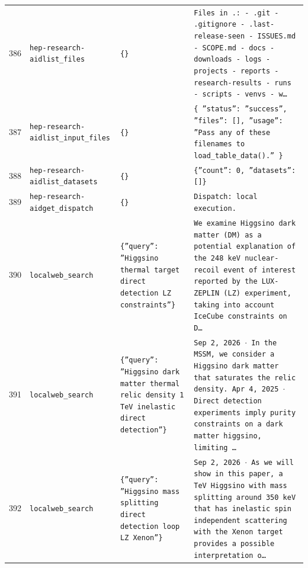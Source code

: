 \documentclass[11pt,a4paper]{article}
\begin{document}
\begin{longtable}{@{}p{}p{}p{}p{}@{}}
386 & \texttt{hep-research-aid}\newline\texttt{list\_\allowbreak{}files} & \texttt{\{\}\allowbreak{}} & \texttt{Files in .:\allowbreak{}   - .git   - .gitignore   - .last-release-seen   - ISSUES.md   - SCOPE.md   - docs   - downloads   - logs   - projects   - reports   - research-results   - runs   - scripts   - venvs   - w\ldots{}\allowbreak{}} \\
387 & \texttt{hep-research-aid}\newline\texttt{list\_\allowbreak{}input\_\allowbreak{}files} & \texttt{\{\}\allowbreak{}} & \texttt{\{   ''status'':\allowbreak{} ''success'',\allowbreak{}   ''files'':\allowbreak{} []\allowbreak{},\allowbreak{}   ''usage'':\allowbreak{} ''Pass any of these filenames to load\_\allowbreak{}table\_\allowbreak{}data()\allowbreak{}.'' \}\allowbreak{}} \\
388 & \texttt{hep-research-aid}\newline\texttt{list\_\allowbreak{}datasets} & \texttt{\{\}\allowbreak{}} & \texttt{\{''count'':\allowbreak{} 0,\allowbreak{} ''datasets'':\allowbreak{} []\allowbreak{}\}\allowbreak{}} \\
389 & \texttt{hep-research-aid}\newline\texttt{get\_\allowbreak{}dispatch} & \texttt{\{\}\allowbreak{}} & \texttt{Dispatch:\allowbreak{} local execution.} \\
390 & \texttt{local}\newline\texttt{web\_\allowbreak{}search} & \texttt{\{''query'':\allowbreak{} ''Higgsino thermal target direct detection LZ constraints''\}\allowbreak{}} & \texttt{We examine Higgsino dark matter (DM)\allowbreak{} as a potential explanation of the 248 keV nuclear-recoil event of interest reported by the LUX-ZEPLIN (LZ)\allowbreak{} experiment,\allowbreak{} taking into account IceCube constraints on D\ldots{}\allowbreak{}} \\
391 & \texttt{local}\newline\texttt{web\_\allowbreak{}search} & \texttt{\{''query'':\allowbreak{} ''Higgsino dark matter thermal relic density 1 TeV inelastic direct detection''\}\allowbreak{}} & \texttt{Sep 2,\allowbreak{} 2026 $\cdot$ In the MSSM,\allowbreak{} we consider a Higgsino dark matter that saturates the relic density. Apr 4,\allowbreak{} 2025 $\cdot$ Direct detection experiments imply purity constraints on a dark matter higgsino,\allowbreak{} limiting \ldots{}\allowbreak{}} \\
392 & \texttt{local}\newline\texttt{web\_\allowbreak{}search} & \texttt{\{''query'':\allowbreak{} ''Higgsino mass splitting direct detection loop LZ Xenon''\}\allowbreak{}} & \texttt{Sep 2,\allowbreak{} 2026 $\cdot$ As we will show in this paper,\allowbreak{} a TeV Higgsino with mass splitting around 350 keV that has inelastic spin independent scattering with the Xenon target provides a possible interpretation o\ldots{}\allowbreak{}} \\

\end{longtable}
\end{document}
